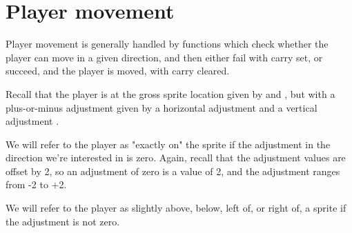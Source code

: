 \documentclass[10pt]{report}%
\begin{document}
\eatline
{}\nwendcode{}\nwdocspar
\section{Player movement}

Player movement is generally handled by functions which check whether the player can
move in a given direction, and then either fail with carry set, or succeed, and the
player is moved, with carry cleared.

Recall that the player is at
the gross sprite location given by {\Tt{}\nwendquote} and {\Tt{}\nwendquote}, but with a plus-or-minus
adjustment given by a horizontal adjustment {\Tt{}\nwendquote} and a vertical adjustment {\Tt{}\nwendquote}.

We will refer to the player as
"exactly on" the sprite if the adjustment in the direction we're interested in is zero.
Again, recall that the adjustment values are offset by {\Tt{}2\nwendquote}, so an adjustment of zero is a value
of {\Tt{}2\nwendquote}, and the adjustment ranges from {\Tt{}-2\nwendquote} to {\Tt{}+2\nwendquote}.

We will refer to the player as slightly above, below, left of, or right of, a sprite if the
adjustment is not zero.
\end{document}
